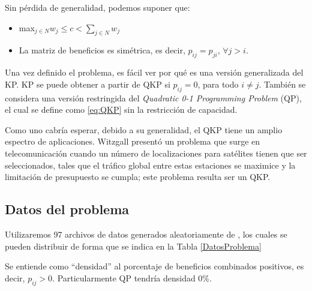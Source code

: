 Sin pérdida de generalidad, podemos suponer que:
\begin{itemize}
	\item max$_{j\in N} w_j \leq c < \sum_{j\in N}w_j$
	\item La matriz de beneficios es simétrica, es decir, $p_{ij} = p_{ji}$, $\forall j > i$.
\end{itemize}

Una vez definido el problema, es fácil ver por qué es una versión generalizada del KP. 
KP se puede obtener a partir de QKP si $p_{ij} = 0$, para todo $i\neq j$. 
También se considera una versión restringida del \textit{Quadratic 0-1 Programming Problem} (QP), el cual se define como \ref{eq:QKP} sin la restricción de capacidad.

Como uno cabría esperar, debido a su generalidad, el QKP tiene un amplio espectro de aplicaciones. 
Witzgall %
presentó un problema que surge en telecomunicación cuando un número de localizaciones para satélites tienen que ser seleccionados, tales que el tráfico global entre estas estaciones se maximice y la limitación de presupuesto se cumpla; este problema resulta ser un QKP. 


\subsection{Datos del problema}

Utilizaremos 97 archivos de datos generados aleatoriamente de %
, los cuales se pueden distribuir de forma que se indica en la Tabla \ref{DatosProblema}



Se entiende como ``densidad'' al porcentaje de beneficios combinados positivos, es decir, $p_{ij} > 0$. 
Particularmente QP tendría densidad 0\%.

